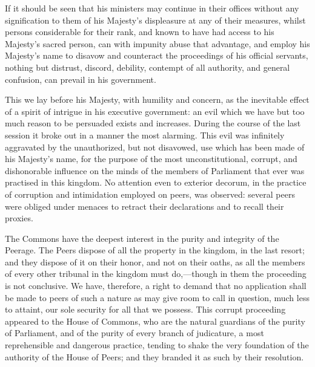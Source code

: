 If it should be seen that his ministers may continue in their offices without any signification to them of his Majesty's displeasure at any of their measures, whilst persons considerable for their rank, and known to have had access to his Majesty's sacred person, can with impunity abuse that advantage, and employ his Majesty's name to disavow and counteract the proceedings of his official servants, nothing but distrust, discord, debility, contempt of all authority, and general confusion, can prevail in his government.

This we lay before his Majesty, with humility and concern, as the inevitable effect of a spirit of intrigue in his executive government: an evil which we have but too much reason to be persuaded exists and increases. During the course of the last session it broke out in a manner the most alarming. This evil was infinitely aggravated by the unauthorized, but not disavowed, use which has been made of his Majesty's name, for the purpose of the most unconstitutional, corrupt, and dishonorable influence on the minds of the members of Parliament that ever was practised in this kingdom. No attention even to exterior decorum, in the practice of corruption and intimidation employed on peers, was observed: several peers were obliged under menaces to retract their declarations and to recall their proxies.

The Commons have the deepest interest in the purity and integrity of the Peerage. The Peers dispose of all the property in the kingdom, in the last resort; and they dispose of it on their honor, and not on their oaths, as all the members of every other tribunal in the kingdom must do,—though in them the proceeding is not conclusive. We have, therefore, a right to demand that no application shall be made to peers of such a nature as may give room to call in question, much less to attaint, our sole security for all that we possess. This corrupt proceeding appeared to the House of Commons, who are the natural guardians of the purity of Parliament, and of the purity of every branch of judicature, a most reprehensible and dangerous practice, tending to shake the very foundation of the authority of the House of Peers; and they branded it as such by their resolution.

